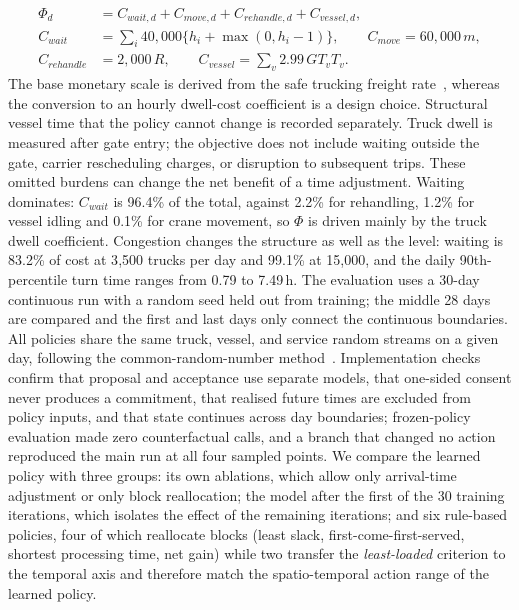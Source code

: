\documentclass[a4paper]{llncs}
\begin{document}
\begin{equation}
\begin{aligned}
\Phi_d&=C_{wait,d}+C_{move,d}+C_{rehandle,d}+C_{vessel,d},\\
C_{wait}&=\sum_i 40{,}000\{h_i+\max(0,h_i-1)\},\qquad
C_{move}=60{,}000\,m,\\
C_{rehandle}&=2{,}000\,R,\qquad
C_{vessel}=\sum_v 2.99\,GT_v T_v.
\end{aligned}
\end{equation}
The base monetary scale is
derived from the safe trucking freight rate~\cite{ref24}, whereas the
conversion to an hourly dwell-cost coefficient is a design choice.
Structural vessel time that the policy cannot change is recorded
separately. Truck dwell is measured after gate entry; the objective
does not include waiting outside the gate, carrier rescheduling
charges, or disruption to subsequent trips. These omitted burdens
can change the net benefit of a time adjustment. Waiting dominates: $C_{wait}$ is 96.4\% of the total, against 2.2\% for
rehandling, 1.2\% for vessel idling and 0.1\% for crane movement, so
$\Phi$ is driven mainly by the truck dwell coefficient. Congestion
changes the structure as well as the level: waiting is 83.2\% of cost at
3{,}500 trucks per day and 99.1\% at 15{,}000, and the daily
90th-percentile turn time ranges from 0.79 to 7.49\,h.
The evaluation uses a 30-day continuous run with a random seed held
out from training; the middle 28 days are
compared and the first and last days only connect the continuous
boundaries. All policies share the same truck, vessel, and service
random streams on a given day, following the common-random-number
method~\cite{ref22}. Implementation checks confirm that proposal and acceptance use separate
models, that one-sided consent never produces a commitment, that realised
future times are excluded from policy inputs, and that state continues
across day boundaries; frozen-policy evaluation made zero counterfactual calls, and
a branch that changed no action reproduced the main run at all four
sampled points. We compare the learned policy with three groups:
its own ablations, which allow only arrival-time adjustment or only
block reallocation; the model after the first of the 30 training
iterations, which isolates the effect of the remaining iterations; and
six rule-based policies, four of which reallocate blocks
(least slack, first-come-first-served, shortest processing time, net
gain) while two transfer the \emph{least-loaded} criterion to the
temporal axis and therefore match the spatio-temporal action range of
the learned policy.
\end{document}

